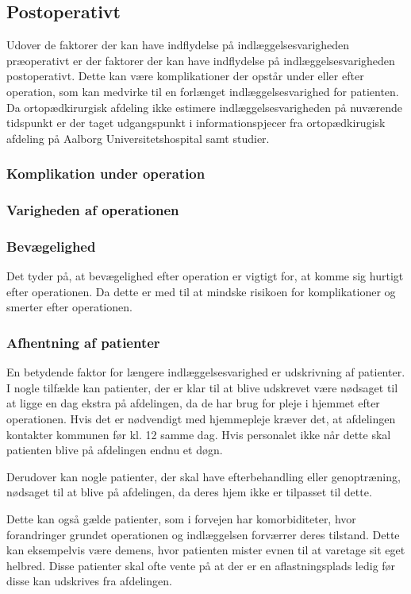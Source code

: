 \subsection{Postoperativt}
Udover de faktorer der kan have indflydelse på indlæggelsesvarigheden  præoperativt er der faktorer der kan have indflydelse på indlæggelsesvarigheden postoperativt. Dette kan være komplikationer der opstår under eller efter operation, som kan medvirke til en forlænget indlæggelsesvarighed for patienten. Da ortopædkirurgisk afdeling ikke estimere indlæggelsesvarigheden på nuværende tidspunkt er der taget udgangspunkt i informationspjecer fra ortopædkirugisk afdeling på Aalborg Universitetshospital samt studier.

\subsubsection{Komplikation under operation}


\subsubsection{Varigheden af operationen}





\subsubsection{Bevægelighed}
Det tyder på, at bevægelighed efter operation er vigtigt for, at komme sig hurtigt efter operationen. Da dette er med til at mindske risikoen for komplikationer og smerter efter operationen. 





\subsubsection{Afhentning af patienter} 
En betydende faktor for længere indlæggelsesvarighed er udskrivning af patienter. I nogle tilfælde kan patienter, der er klar til at blive udskrevet være nødsaget til at ligge en dag ekstra på afdelingen, da de har brug for pleje i hjemmet efter operationen. Hvis det er nødvendigt med hjemmepleje kræver det, at afdelingen kontakter kommunen før kl. 12 samme dag. Hvis personalet ikke når dette skal patienten blive på afdelingen endnu et døgn. 

Derudover kan nogle patienter, der skal have efterbehandling eller genoptræning,  nødsaget til at blive på afdelingen, da deres hjem ikke er tilpasset til dette. 

Dette kan også gælde patienter, som i forvejen har komorbiditeter, hvor forandringer grundet operationen og indlæggelsen forværrer deres tilstand. Dette kan eksempelvis være demens, hvor patienten mister evnen til at varetage sit eget helbred. Disse patienter skal ofte vente på at der er en aflastningsplads ledig før disse kan udskrives fra afdelingen. 


